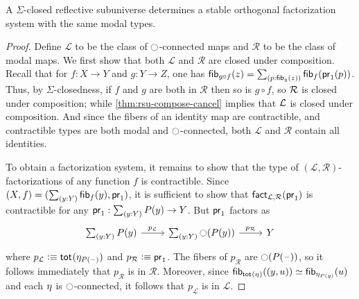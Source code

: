 \begin{thm}\label{thm:sofs_from_ssrs}
A $\Sigma$-closed reflective subuniverse determines a stable orthogonal factorization system with the same
modal types.
\end{thm}

\begin{proof}
Define $\mathcal{L}$ to be the class of $\modal$-connected
maps and $\mathcal{R}$ to be the class of modal maps.
We first show that both $\mathcal{L}$ and $\mathcal{R}$ are closed under
composition. Recall that for $f:X\to Y$ and $g:Y\to Z$, one has
$\fib{g\circ f}{z}=\sm{p:\fib{g}{z}}\fib{f}{\proj1(p)}$.
Thus, by $\Sigma$-closedness, if $f$ and $g$ are both in $\mathcal{R}$ then so is $g\circ f$, so $\cR$ is closed under composition; while \cref{thm:rsu-compose-cancel} implies that $\cL$ is closed under composition.
And since the fibers of an identity map are contractible, and contractible types are both modal and $\modal$-connected, both $\mathcal{L}$ and $\mathcal{R}$ contain all identities.


To obtain a factorization system,
it remains to show that the type of
$(\mathcal{L},\mathcal{R})$-factorizations of any function $f$ is contractible.
Since $\pairr{X,f}=\pairr{\sm{y:Y}\fib{f}{y},\proj1}$, it is sufficient to
show that $\fact_{\mathcal{L},\mathcal{R}}(\proj1)$ is contractible for any
$\proj1:\sm{y:Y}P(y)\to Y$. But $\proj1$ factors as
\begin{equation*}
\begin{tikzcd}
\sm{y:Y}P(y) \arrow[r,"p_\mathcal{L}"] & \sm{y:Y}\modal(P(y)) \arrow[r,"p_\mathcal{R}"] & Y
\end{tikzcd}
\end{equation*}
where $p_\mathcal{L}\defeq\total{\modalunit[P(\blank)]}$ and $p_\mathcal{R}\defeq\proj1$.
The fibers of $p_\mathcal{R}$ are $\modal(P(\blank))$, so it follows
immediately that $p_\mathcal{R}$ is in $\mathcal{R}$.
Moreover, since
$\eqv{\fib{\total{\modalunit}}{\pairr{y,u}}}{\fib{\modalunit[P(y)]}{u}}$ and each $\modalunit$ is $\modal$-connected, it follows that $p_\mathcal{L}$ is in
$\mathcal{L}$.


\end{proof}
